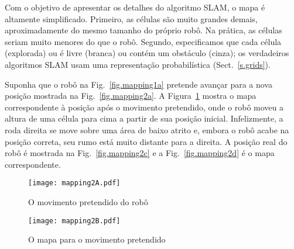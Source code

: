 %

Com o objetivo de apresentar os detalhes do algoritmo SLAM, o mapa é altamente simplificado. Primeiro, as células são muito grandes demais, aproximadamente do mesmo tamanho do próprio robô. Na prática, as células seriam muito menores do que o robô. Segundo, especificamos que cada célula (explorada) ou é livre (branca) ou contém um obstáculo (cinza); os verdadeiros algoritmos SLAM usam uma representação probabilística (Sect.~\ref{s.grids}).

Suponha que o robô na Fig.~\ref{fig.mapping1a} pretende avançar para a nova posição mostrada na Fig.~\ref{fig.mapping2a}. A Figura~\ref{fig.mapping2b} mostra o mapa correspondente à posição após o movimento pretendido, onde o robô moveu a altura de uma célula para cima a partir de sua posição inicial. Infelizmente, a roda direita se move sobre uma área de baixo atrito e, embora o robô acabe na posição correta, seu rumo está muito distante para a direita. A posição real do robô é mostrada na Fig.~\ref{fig.mapping2c} e a Fig.~\ref{fig.mapping2d} é o mapa correspondente.

\begin{figure}
\begin{minipage}{.45\textwidth}
\texttt{[image: mapping2A.pdf]}
\caption{O movimento pretendido do robô}
\label{fig.mapping2a}
\end{minipage}
\hspace{\fill}
\begin{minipage}{.45\textwidth}
\texttt{[image: mapping2B.pdf]}
\caption{O mapa para o movimento pretendido}
\label{fig.mapping2b}
\end{minipage}
\end{figure}

